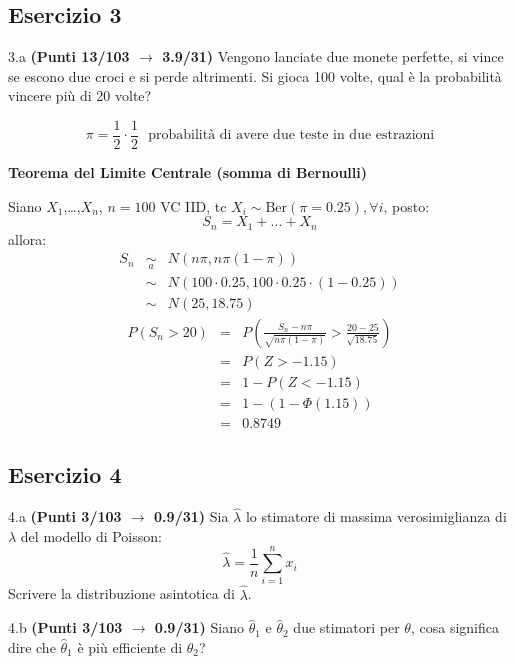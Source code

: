 \documentclass[
  11pt,
]{book}
\theoremstyle{mytheoremstyle}
\theoremstyle{mydefstyle}
\newenvironment{sol}
  {
  \begin{tcolorbox}[enhanced,breakable,arc=0.1mm,boxrule=1pt,colback=white,colframe=iblue,
  title=\bf \fontfamily{lmss}\selectfont \hspace{.5 cm} Soluzione,drop fuzzy shadow]

}{
\end{tcolorbox}
  }
\begin{document}
\subsection{Esercizio 3}\label{esercizio-3-45}

3.a \textbf{(Punti 13/103 \(\rightarrow\) 3.9/31)} Vengono lanciate due monete perfette, si vince se escono due croci e si perde altrimenti. Si gioca 100 volte, qual è la probabilità vincere più di 20 volte?

\begin{sol}
\[
\pi = \frac 12 \cdot \frac 12 ~~~\text{probabilità di avere due teste in due estrazioni}
\]

\textbf{Teorema del Limite Centrale (somma di Bernoulli)}

Siano \(X_1\),\ldots,\(X_n\), \(n=100\) VC IID, tc \(X_i\sim\text{Ber}(\pi=0.25)\)\(,\forall i\), posto:
\[
      S_n = X_1 + ... + X_n
      \]
allora:\begin{eqnarray*}
  S_n & \mathop{\sim}\limits_{a}& N(n\pi,n\pi(1-\pi)) \\
      &\sim & N(100\cdot0.25,100\cdot0.25\cdot(1-0.25)) \\
      &\sim & N(25,18.75)
  \end{eqnarray*}\begin{eqnarray*}
      P( S_n   >   20 ) 
        &=& P\left(  \frac { S_n  -  n\pi }{ \sqrt{n\pi(1-\pi)} }  >  \frac { 20  -  25 }{\sqrt{ 18.75 }} \right)  \\
                 &=& P\left(  Z   >   -1.15 \right) \\    &=& 1-P(Z< -1.15 )\\ 
                 &=&  1-(1-\Phi( 1.15 )) \\ &=&  0.8749 
      \end{eqnarray*}

\end{sol}

\subsection{Esercizio 4}\label{esercizio-4-45}

4.a \textbf{(Punti 3/103 \(\rightarrow\) 0.9/31)} Sia \(\hat\lambda\) lo stimatore di massima
verosimiglianza di \(\lambda\) del modello di Poisson:
\[
\hat\lambda =  \frac 1n\sum_{i=1}^n x_i
\]
Scrivere la distribuzione asintotica di \(\hat\lambda\).

4.b \textbf{(Punti 3/103 \(\rightarrow\) 0.9/31)} Siano \(\hat\theta_1\) e \(\hat\theta_2\) due stimatori per \(\theta\), cosa significa dire che \(\hat\theta_1\) è più efficiente di \(\theta_2\)?
\end{document}
